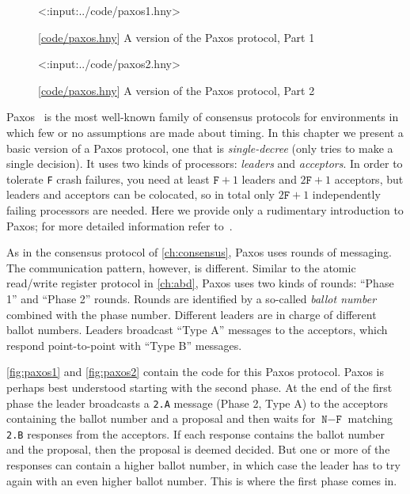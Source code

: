 \documentclass{report}
\newcommand{\harmonylink}[1]{%
[\href{https://harmony.cs.cornell.edu/#1}{\underline{#1}}]%
}
\newenvironment{code}{
\tcolorbox
}{
\endtcolorbox
}
\begin{document}
{\begin{figure}
\begin{code}
<{:input:../code/paxos1.hny}>
\end{code}
\caption{\harmonylink{code/paxos.hny} A version of the Paxos protocol, Part 1}
\label{fig:paxos1}
\end{figure}

\begin{figure}
\begin{code}
<{:input:../code/paxos2.hny}>
\end{code}
\caption{\harmonylink{code/paxos.hny} A version of the Paxos protocol, Part 2}
\label{fig:paxos2}
\end{figure}

Paxos~\cite{Paxos} is the most well-known family of consensus protocols for
environments in which few or no assumptions are made about timing.
In this chapter we present a basic version of a Paxos protocol, one that is
\emph{single-decree} (only tries to make a single decision).
It uses two kinds of processors: \emph{leaders} and \emph{acceptors}.
In order to tolerate \texttt{F} crash failures, you need at least $\texttt{F}+1$ leaders
and $2\texttt{F} + 1$ acceptors, but leaders and acceptors can be colocated, so
in total only $2\texttt{F} + 1$ independently failing processors are needed.
Here we provide only a rudimentary introduction to Paxos; for more detailed
information refer to~\cite{Paxos}.

As in the consensus protocol of \autoref{ch:consensus}, Paxos uses rounds of messaging.
The communication pattern, however, is different.
Similar to the atomic read/write register protocol in \autoref{ch:abd},
Paxos uses two kinds of rounds: ``Phase 1'' and ``Phase 2'' rounds.
Rounds are identified by a so-called
\emph{ballot number} combined with the phase number.
Different leaders are in charge of different ballot numbers.
Leaders broadcast ``Type A''
messages to the acceptors, which respond point-to-point with ``Type B''
messages.

\autoref{fig:paxos1} and \autoref{fig:paxos2} contain the code for
this Paxos protocol.  Paxos is perhaps best understood starting
with the second phase.  At the end of the first phase the leader
broadcasts a \texttt{2.A} message (Phase 2, Type A) to the acceptors
containing the ballot number and a proposal and then waits for
$\texttt{N} - \texttt{F}$ matching \texttt{2.B} responses from the
acceptors.  If each response contains the ballot number and the
proposal, then the proposal is deemed decided.  But one or more of
the responses can contain a higher ballot number, in which case the
leader has to try again with an even higher ballot number.  This is
where the first phase comes in.

}
\end{document}

